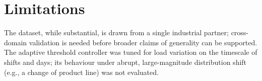 \section{Limitations}
The dataset, while substantial, is drawn from a single industrial partner; cross-domain
validation is needed before broader claims of generality can be supported. The adaptive
threshold controller was tuned for load variation on the timescale of shifts and days;
its behaviour under abrupt, large-magnitude distribution shift (e.g., a change of product
line) was not evaluated.
